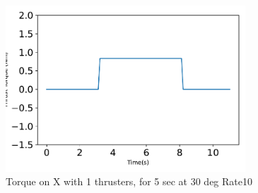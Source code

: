 \begin{figure}[htbp]\centerline{\includegraphics[width=0.8\textwidth]{AutoTeX/Torque_1Thrusters_5s_30deg_Loc2_Rate10}}\caption{Torque on X with 1 thrusters, for 5 sec at 30 deg Rate10}\label{fig:Torque_1Thrusters_5s_30deg_Loc2_Rate10}\end{figure}